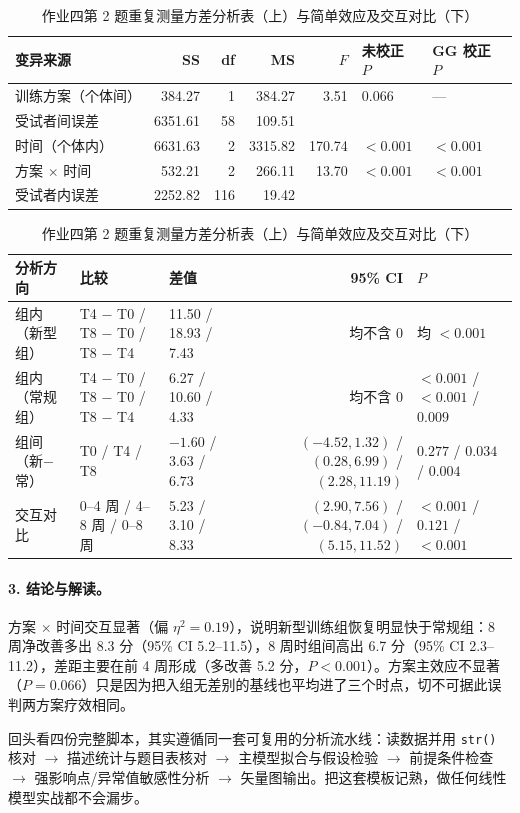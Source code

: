 \begin{table}[htbp]
\centering\small
\caption{作业四第 2 题重复测量方差分析表（上）与简单效应及交互对比（下）}
\begin{tabular}{@{}lrrrrll@{}}
\toprule
变异来源 & SS & df & MS & $F$ & 未校正 $P$ & GG 校正 $P$\\
\midrule
训练方案（个体间） & 384.27   & 1   & 384.27  & 3.51   & 0.066    & ---\\
受试者间误差       & 6351.61  & 58  & 109.51  &        &          & \\
时间（个体内）     & 6631.63  & 2   & 3315.82 & 170.74 & $<0.001$ & $<0.001$\\
方案 $\times$ 时间 & 532.21   & 2   & 266.11  & 13.70  & $<0.001$ & $<0.001$\\
受试者内误差       & 2252.82  & 116 & 19.42   &        &          & \\
\bottomrule
\end{tabular}

\vspace{0.8em}
\begin{tabular}{@{}lllrl@{}}
\toprule
分析方向 & 比较 & 差值 & 95\% CI & $P$\\
\midrule
组内（新型组） & T4 $-$ T0 / T8 $-$ T0 / T8 $-$ T4 & 11.50 / 18.93 / 7.43 & 均不含 0 & 均 $<0.001$\\
组内（常规组） & T4 $-$ T0 / T8 $-$ T0 / T8 $-$ T4 & 6.27 / 10.60 / 4.33  & 均不含 0 & $<0.001$ / $<0.001$ / $0.009$\\
组间（新$-$常）& T0 / T4 / T8                      & $-1.60$ / $3.63$ / $6.73$ & $(-4.52,1.32)$ / $(0.28,6.99)$ / $(2.28,11.19)$ & $0.277$ / $0.034$ / $0.004$\\
交互对比       & 0--4 周 / 4--8 周 / 0--8 周       & 5.23 / 3.10 / 8.33   & $(2.90,7.56)$ / $(-0.84,7.04)$ / $(5.15,11.52)$ & $<0.001$ / $0.121$ / $<0.001$\\
\bottomrule
\end{tabular}
\end{table}

\paragraph{3. 结论与解读。}方案 $\times$ 时间交互显著（偏 $\eta^2=0.19$），说明新型训练组恢复明显快于常规组：8 周净改善多出 8.3 分（95\% CI 5.2--11.5），8 周时组间高出 6.7 分（95\% CI 2.3--11.2），差距主要在前 4 周形成（多改善 5.2 分，$P<0.001$）。方案主效应不显著（$P=0.066$）只是因为把入组无差别的基线也平均进了三个时点，切不可据此误判两方案疗效相同。

\begin{notebox}[四份作业代码的共同写作模板]
回头看四份完整脚本，其实遵循同一套可复用的分析流水线：读数据并用 \Verb|str()| 核对 $\to$ 描述统计与题目表核对 $\to$ 主模型拟合与假设检验 $\to$ 前提条件检查 $\to$ 强影响点/异常值敏感性分析 $\to$ 矢量图输出。把这套模板记熟，做任何线性模型实战都不会漏步。
\end{notebox}
